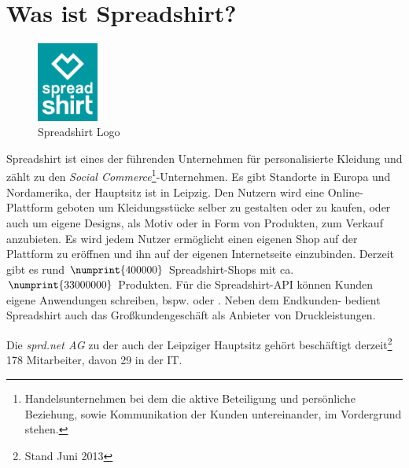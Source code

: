 \section{Was ist Spreadshirt?}
\label{sec:spreadshirt}

\begin{figure}[!htb]
	\centering
		\includegraphics[width=2cm]{resources/sprd_logo_cmyk}
	\caption{Spreadshirt Logo}
	\label{fig:spreadshirtLogo}
\end{figure}

Spreadshirt ist eines der führenden Unternehmen für personalisierte Kleidung und zählt zu den \emph{Social Commerce}\footnote{Handelsunternehmen bei dem die aktive Beteiligung und persönliche Beziehung, sowie Kommunikation der Kunden untereinander, im Vordergrund stehen.}-Unternehmen. Es gibt Standorte in Europa und Nordamerika, der Hauptsitz ist in Leipzig. 
Den Nutzern wird eine Online-Plattform geboten um Kleidungsstücke selber zu gestalten oder zu kaufen, oder auch um eigene Designs, als Motiv oder in Form von Produkten, zum Verkauf anzubieten. 
Es wird jedem Nutzer ermöglicht einen eigenen Shop auf der Plattform zu eröffnen und ihn auf der eigenen Internetseite einzubinden. Derzeit gibt es rund $\numprint{400000}$ Spreadshirt-Shops mit ca. $\numprint{33000000}$ Produkten.
Für die Spreadshirt-API können Kunden eigene Anwendungen schreiben, bspw.  oder .
Neben dem Endkunden- bedient Spreadshirt auch das Großkundengeschäft als Anbieter von Druckleistungen.

Die \emph{sprd.net AG} zu der auch der Leipziger Hauptsitz gehört beschäftigt derzeit\footnote{Stand Juni 2013} 178 Mitarbeiter, davon 29 in der IT.